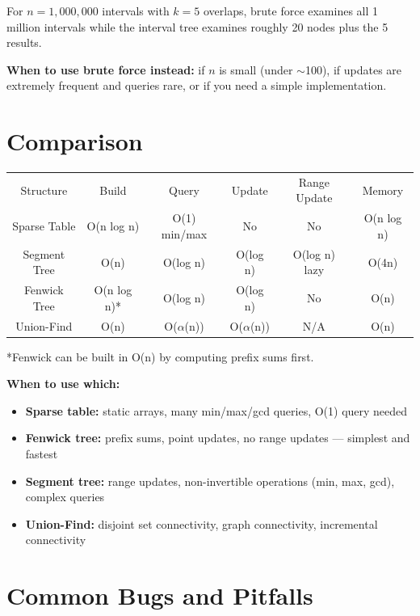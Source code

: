 For $n = 1{,}000{,}000$ intervals with $k = 5$ overlaps, brute force examines all 1 million intervals while the interval tree examines roughly 20 nodes plus the 5 results.

\textbf{When to use brute force instead:} if $n$ is small (under $\sim$100), if updates are extremely frequent and queries rare, or if you need a simple implementation.

\section{Comparison}

\begin{center}
\begin{tabular}{cccccc}
\toprule
Structure & Build & Query & Update & Range Update & Memory \\
Sparse Table & O(n log n) & O(1) min/max & No & No & O(n log n) \\
Segment Tree & O(n) & O(log n) & O(log n) & O(log n) lazy & O(4n) \\
Fenwick Tree & O(n log n)* & O(log n) & O(log n) & No & O(n) \\
Union-Find & O(n) & O($\alpha $(n)) & O($\alpha $(n)) & N/A & O(n) \\

\bottomrule
\end{tabular}
\end{center}
*Fenwick can be built in O(n) by computing prefix sums first.

\textbf{When to use which:}
\begin{itemize}
\item \textbf{Sparse table:} static arrays, many min/max/gcd queries, O(1) query needed
\item \textbf{Fenwick tree:} prefix sums, point updates, no range updates — simplest and fastest
\item \textbf{Segment tree:} range updates, non-invertible operations (min, max, gcd), complex queries
\item \textbf{Union-Find:} disjoint set connectivity, graph connectivity, incremental connectivity
\end{itemize}

\section{Common Bugs and Pitfalls}

